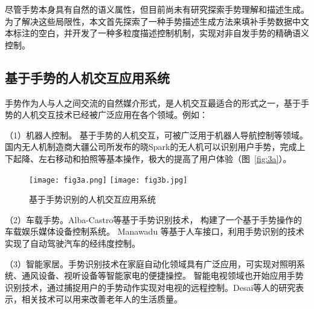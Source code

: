 尽管手势本身具有自然的语义属性，但目前尚未有研究探索手势理解和描述生成。
为了解决这些局限性，本文首先探索了一种手势描述生成方法来填补手势数据中文本标注的空白，并开发了一种多粒度描述控制机制，实现对非自发手势的精确语义控制。



\subsection{基于手势的人机交互应用系统}
手势作为人与人之间交流的自然媒介形式，是人机交互最适合的形式之一\cite{oudah2020hand}，基于手势的人机交互技术已经被广泛应用在各个领域。例如：

（1）机器人控制。 基于手势的人机交互，可被广泛用于机器人导航控制等领域\cite{al20223d}。国内无人机制造商大疆公司所发布的晓Spark的无人机可以识别用户手势，完成上下起降、左右移动和拍照等基本操作，极大的提高了用户体验（图~\ref{fig:3a}）。

\begin{figure}
  \centering
    {\texttt{[image: fig3a.png]}}
    {\texttt{[image: fig3b.jpg]}}
  \caption{基于手势识别的人机交互应用系统}
  \label{fig:HCI_system}
\end{figure}

（2）车载手势。Alba-Castro等基于手势识别技术， 构建了一个基于手势操作的车载娱乐媒体设备控制系统\cite{parada2014hand}。 Manawadu 等基于人车接口，利用手势识别的技术实现了自动驾驶汽车的经纬度控制\cite{manawadu2016hand}。

（3）智能家居。手势识别技术在家庭自动化领域具有广泛应用，可实现对照明系统、通风设备、视听设备等智能家电的便捷操控。
智能电视领域也开始应用手势识别技术，通过捕捉用户的手势动作实现对电视的远程控制。Desai等人的研究表示，相关技术可以用来改善老年人的生活质量\cite{desai2017human}。

